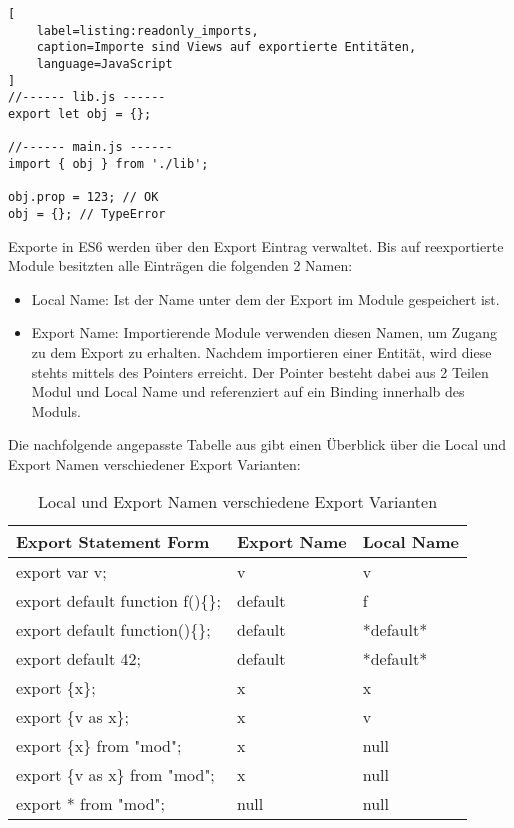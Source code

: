\begin{lstlisting}[
    label=listing:readonly_imports,
    caption=Importe sind Views auf exportierte Entitäten,
	language=JavaScript
]
//------ lib.js ------
export let obj = {};

//------ main.js ------
import { obj } from './lib';

obj.prop = 123; // OK
obj = {}; // TypeError
\end{lstlisting}

Exporte in ES6 werden über den Export Eintrag verwaltet. Bis auf reexportierte Module besitzten alle Einträgen die folgenden 2 Namen: 

\begin{itemize}
\item Local Name: Ist der Name unter dem der Export im Module gespeichert ist.
\item Export Name: Importierende Module verwenden diesen Namen, um Zugang zu dem Export zu erhalten. Nachdem importieren einer Entität, wird diese stehts mittels des Pointers erreicht. Der Pointer besteht dabei aus 2 Teilen Modul und Local Name und referenziert auf ein Binding innerhalb des Moduls.
\end{itemize}
\autocite{Rauschmayer2018}

Die nachfolgende angepasste Tabelle aus \textcite{ECMAScript} gibt einen Überblick über die Local und Export Namen verschiedener Export Varianten:

\begin{table}[H]
\centering
\caption{Local und Export Namen verschiedene Export Varianten}
\label{local_export_names}
\begin{tabular}{|l|l|l|}
\hline
Export Statement Form            & Export Name & Local Name \\ \hline
export var v;                    & v           & v          \\ \hline
export default function f()\{\}; & default     & f          \\ \hline
export default function()\{\};   & default     & *default*  \\ \hline
export default 42;               & default     & *default*  \\ \hline
export \{x\};                    & x           & x          \\ \hline
export \{v as x\};               & x           & v          \\ \hline
export \{x\} from "mod";         & x           & null       \\ \hline
export \{v as x\} from "mod";    & x           & null       \\ \hline
export * from "mod";             & null        & null       \\ \hline
\end{tabular}
\end{table}

